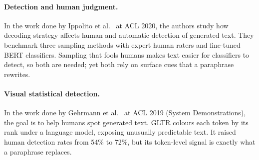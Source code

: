 \paragraph{Detection and human judgment.}
In the work done by Ippolito et al.~\cite{ippolito2020automatic} at ACL 2020, the authors study how
decoding strategy affects human and automatic detection of generated text. They benchmark three
sampling methods with expert human raters and fine-tuned BERT classifiers. Sampling that fools
humans makes text easier for classifiers to detect, so both are needed; yet both rely on surface
cues that a paraphrase rewrites.

\paragraph{Visual statistical detection.}
In the work done by Gehrmann et al.~\cite{gehrmann2019gltr} at ACL 2019 (System Demonstrations),
the goal is to help humans spot generated text. GLTR colours each token by its rank under a
language model, exposing unusually predictable text. It raised human detection rates from 54\% to
72\%, but its token-level signal is exactly what a paraphrase replaces.
